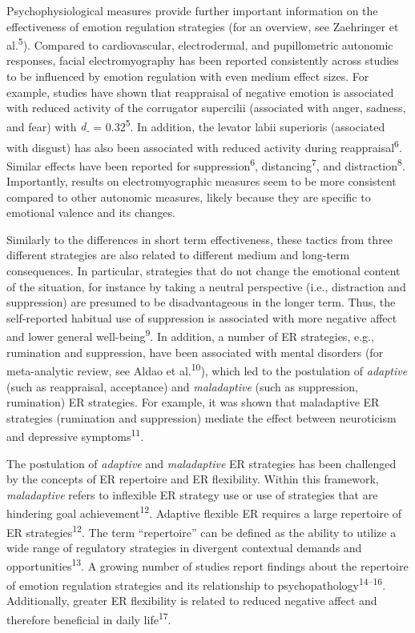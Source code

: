 \documentclass[
  english,
  man,floatsintext]{apa6}
\begin{document}
Psychophysiological measures provide further important information on the effectiveness of emotion regulation strategies (for an overview, see Zaehringer et al.\textsuperscript{5}).
Compared to cardiovascular, electrodermal, and pupillometric autonomic responses, facial electromyography has been reported consistently across studies to be influenced by emotion regulation with even medium effect sizes.
For example, studies have shown that reappraisal of negative emotion is associated with reduced activity of the corrugator supercilii (associated with anger, sadness, and fear) with \emph{d\textsubscript{-}} = 0.32\textsuperscript{5}.
In addition, the levator labii superioris (associated with disgust) has also been associated with reduced activity during reappraisal\textsuperscript{6}.
Similar effects have been reported for suppression\textsuperscript{6}, distancing\textsuperscript{7}, and distraction\textsuperscript{8}.
Importantly, results on electromyographic measures seem to be more consistent compared to other autonomic measures, likely because they are specific to emotional valence and its changes.

Similarly to the differences in short term effectiveness, these tactics from three different strategies are also related to different medium and long-term consequences.
In particular, strategies that do not change the emotional content of the situation, for instance by taking a neutral perspective (i.e., distraction and suppression) are presumed to be disadvantageous in the longer term.
Thus, the self-reported habitual use of suppression is associated with more negative affect and lower general well-being\textsuperscript{9}.
In addition, a number of ER strategies, e.g., rumination and suppression, have been associated with mental disorders (for meta-analytic review, see Aldao et al.\textsuperscript{10}), which led to the postulation of \emph{adaptive} (such as reappraisal, acceptance) and \emph{maladaptive} (such as suppression, rumination) ER strategies.
For example, it was shown that maladaptive ER strategies (rumination and suppression) mediate the effect between neuroticism and depressive symptoms\textsuperscript{11}.

The postulation of \emph{adaptive} and \emph{maladaptive} ER strategies has been challenged by the concepts of ER repertoire and ER flexibility.
Within this framework, \emph{maladaptive} refers to inflexible ER strategy use or use of strategies that are hindering goal achievement\textsuperscript{12}.
Adaptive flexible ER requires a large repertoire of ER strategies\textsuperscript{12}.
The term ``repertoire'' can be defined as the ability to utilize a wide range of regulatory strategies in divergent contextual demands and opportunities\textsuperscript{13}.
A growing number of studies report findings about the repertoire of emotion regulation strategies and its relationship to psychopathology\textsuperscript{14--16}.
Additionally, greater ER flexibility is related to reduced negative affect and therefore beneficial in daily life\textsuperscript{17}.
\end{document}
